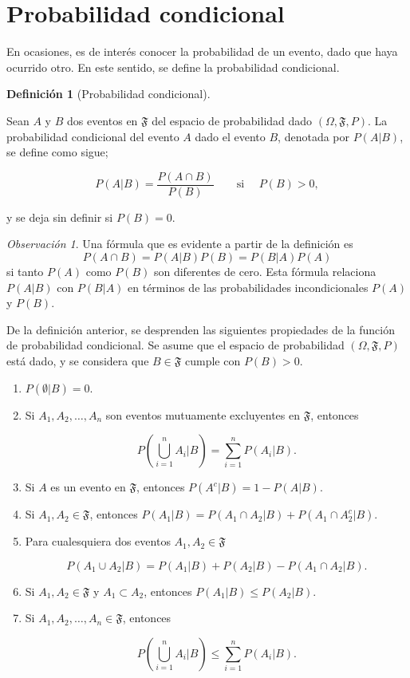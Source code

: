 \documentclass[
  us-letterpaper,
]{scrreprt}
\theoremstyle{definition}
\theoremstyle{plain}
\theoremstyle{plain}
\theoremstyle{definition}
\newtheorem{definition}{Definición}[chapter]
\theoremstyle{remark}
\newtheorem*{remark}{Observación}
\begin{document}
\section{Probabilidad condicional}\label{probabilidad-condicional}

En ocasiones, es de interés conocer la probabilidad de un evento, dado
que haya ocurrido otro. En este sentido, se define la probabilidad
condicional.

\begin{definition}[Probabilidad
condicional]\protect\hypertarget{def-pcond}{}\label{def-pcond}

Sean \(A\) y \(B\) dos eventos en \(\mathfrak{F}\) del espacio de
probabilidad dado \((\Omega, \mathfrak{F}, P)\). La probabilidad
condicional del evento \(A\) dado el evento \(B\), denotada por
\(P(A|B)\), se define como sigue;

\[P(A|B)= \frac{P(A\cap B)}{P(B)}\qquad\text{si }\quad P(B)>0,\]

y se deja sin definir si \(P(B)=0\).

\end{definition}

\begin{remark}
Una fórmula que es evidente a partir de la definición es
\[P(A\cap B)= P(A|B)P(B)=P(B|A)P(A)\] si tanto \(P(A)\) como \(P(B)\)
son diferentes de cero. Esta fórmula relaciona \(P(A|B)\) con \(P(B|A)\)
en términos de las probabilidades incondicionales \(P(A)\) y \(P(B)\).
\end{remark}

De la definición anterior, se desprenden las siguientes propiedades de
la función de probabilidad condicional. Se asume que el espacio de
probabilidad \((\Omega, \mathfrak{F}, P)\) está dado, y se considera que
\(B\in\mathfrak{F}\) cumple con \(P(B)>0\).

\begin{enumerate}
\def\labelenumi{\roman{enumi}.}
\item
  \(P(\emptyset| B)=0\).
\item
  Si \(A_1, A_2, \ldots, A_n\) son eventos mutuamente excluyentes en
  \(\mathfrak{F}\), entonces

  \[P\left(\bigcup_{i=1}^n A_i|B\right)= \sum_{i=1}^n P(A_i|B).\]
\item
  Si \(A\) es un evento en \(\mathfrak{F}\), entonces
  \(P(A^c| B)=1-P(A|B)\).
\item
  Si \(A_1, A_2\in \mathfrak{F}\), entonces
  \(P(A_1|B)=P(A_1\cap A_2|B)+ P(A_1\cap A_2^c|B)\).
\item
  Para cualesquiera dos eventos \(A_1,A_2\in \mathfrak{F}\)

  \[P(A_1\cup A_2|B)=P(A_1|B)+P(A_2|B)-P(A_1\cap A_2|B).\]
\item
  Si \(A_1, A_2\in\mathfrak{F}\) y \(A_1\subset A_2\), entonces
  \(P(A_1|B)\leq P(A_2|B)\).
\item
  Si \(A_1, A_2,\ldots, A_n\in\mathfrak{F}\), entonces

  \[P\left(\bigcup_{i=1}^n A_i|B\right)\leq \sum_{i=1}^n P(A_i|B).\]
\end{enumerate}
\end{document}
